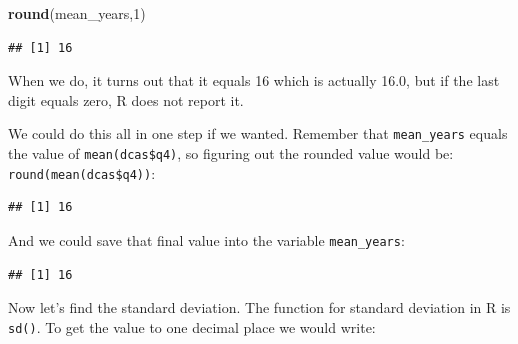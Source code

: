 \documentclass[]{article}
\newenvironment{Shaded}{\begin{snugshade}}{\end{snugshade}}
\newcommand{\KeywordTok}[1]{\textcolor[rgb]{0.13,0.29,0.53}{\textbf{{#1}}}}
\newcommand{\DecValTok}[1]{\textcolor[rgb]{0.00,0.00,0.81}{{#1}}}
\newcommand{\StringTok}[1]{\textcolor[rgb]{0.31,0.60,0.02}{{#1}}}
\newcommand{\NormalTok}[1]{{#1}}
\begin{document}
\begin{Shaded}
\begin{Highlighting}[]
\KeywordTok{round}\NormalTok{(mean_years,}\DecValTok{1}\NormalTok{)}
\end{Highlighting}
\end{Shaded}

\begin{verbatim}
## [1] 16
\end{verbatim}

When we do, it turns out that it equals 16 which is actually 16.0, but
if the last digit equals zero, R does not report it.

We could do this all in one step if we wanted. Remember that
\texttt{mean\_years} equals the value of \texttt{mean(dcas\$q4)}, so
figuring out the rounded value would be: \texttt{round(mean(dcas\$q4))}:

\begin{Shaded}
\end{Shaded}

\begin{verbatim}
## [1] 16
\end{verbatim}

And we could save that final value into the variable
\texttt{mean\_years}:

\begin{Shaded}
\end{Shaded}

\begin{verbatim}
## [1] 16
\end{verbatim}

Now let's find the standard deviation. The function for standard
deviation in R is \texttt{sd()}. To get the value to one decimal place
we would write:

\begin{Shaded}
\end{Shaded}
\end{document}
